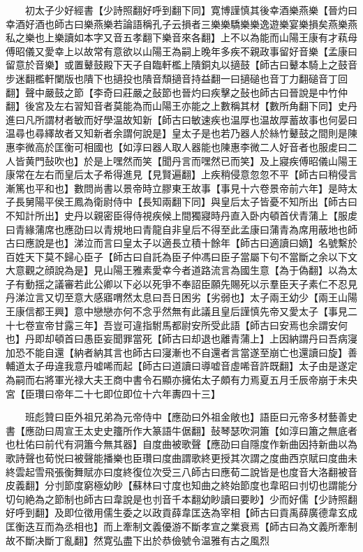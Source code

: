 　　初太子少好經書【少詩照翻好呼到翻下同】寛博謹慎其後幸酒樂燕樂【晉灼曰幸酒好酒也師古曰樂燕樂若論語稱孔子云損者三樂樂驕樂樂逸遊樂宴樂損矣燕樂燕私之樂也上樂讀如本字又音五孝翻下樂音來各翻】上不以為能而山陽王康有才萟母傅昭儀又愛幸上以故常有意欲以山陽王為嗣上晚年多疾不親政事留好音樂【孟康曰留意於音樂】或置鼙鼓殿下天子自臨軒檻上隤銅丸以擿鼓【師古曰鼙本騎上之鼓音步迷翻檻軒闌版也隤下也擿投也隤音頹擿音持益翻一曰擿磓也音丁力翻磓音丁回翻】聲中嚴鼓之節【李奇曰莊嚴之鼔節也晉灼曰疾擊之鼔也師古曰晉說是中竹仲翻】後宮及左右習知音者莫能為而山陽王亦能之上數稱其材【數所角翻下同】史丹進曰凡所謂材者敏而好學温故知新【師古曰敏速疾也温厚也温故厚蓄故事也何晏曰温尋也尋繹故者又知新者余謂何說是】皇太子是也若乃器人於絲竹鼙鼓之間則是陳惠李微高於匡衡可相國也【如淳曰器人取人器能也陳惠李微二人好音者也服䖍曰二人皆黄門鼔吹也】於是上嘿然而笑【聞丹言而嘿然已而笑】及上寢疾傅昭儀山陽王康常在左右而皇后太子希得進見【見賢遍翻】上疾稍侵意忽忽不平【師古曰稍侵言漸篤也平和也】數問尚書以景帝時立膠東王故事【事見十六卷景帝前六年】是時太子長舅陽平侯王鳳為衛尉侍中【長知兩翻下同】與皇后太子皆憂不知所出【師古曰不知計所出】史丹以親密臣得侍視疾候上間獨寢時丹直入卧内頓首伏青蒲上【服䖍曰青緣蒲席也應劭曰以青規地曰青龍自非皇后不得至此孟康曰蒲青為席用蔽地也師古曰應說是也】涕泣而言曰皇太子以適長立積十餘年【師古曰適讀曰嫡】名號繫於百姓天下莫不歸心臣子【師古曰自託為臣子仲馮曰臣子當屬下句不當斷之余以下文大意觀之顔說為是】見山陽王雅素愛幸今者道路流言為國生意【為于偽翻】以為太子有動揺之議審若此公卿以下必以死爭不奉詔臣願先賜死以示羣臣天子素仁不忍見丹涕泣言又切至意大感寤喟然太息曰吾日困劣【劣弱也】太子兩王幼少【兩王山陽王康信都王興】意中戀戀亦何不念乎然無有此議且皇后謹慎先帝又愛太子【事見二十七卷宣帝甘露三年】吾豈可違指駙馬都尉安所受此語【師古曰安焉也余謂安何也】丹即却頓首曰愚臣妄聞罪當死【師古曰却退也離青蒲上】上因納謂丹曰吾病寖加恐不能自還【納者納其言也師古曰寖漸也不自還者言當遂至崩亡也還讀曰旋】善輔道太子毋違我意丹嘘唏而起【師古曰道讀曰導嘘音虛唏音許既翻】太子由是遂定為嗣而右將軍光禄大夫王商中書令石顯亦擁佑太子頗有力焉夏五月壬辰帝崩于未央宮【臣瓚曰帝年二十七即位即位十六年夀四十三】

　　班彪贊曰臣外祖兄弟為元帝侍中【應劭曰外祖金敞也】語臣曰元帝多材藝善史書【應劭曰周宣王太史史籒所作大篆語牛倨翻】鼔琴瑟吹洞簫【如淳曰簫之無底者也杜佑曰前代有洞簫今無其器】自度曲被歌聲【應劭曰自隱度作新曲因持新曲以為歌詩聲也荀悦曰被聲能播樂也臣瓚曰度曲謂歌終更授其次謂之度曲西京賦曰度曲未終雲起雪飛張衡舞賦亦曰度終復位次受三八師古曰應荀二說皆是也度音大洛翻被音皮義翻】分刌節度窮極幼眇【蘇林曰寸度也知曲之終始節度也韋昭曰刌切也謂能分切句絶為之節制也師古曰韋說是也刌音千本翻幼眇讀曰要眇】少而好儒【少詩照翻好呼到翻】及即位徵用儒生委之以政貢薛韋匡迭為宰相【師古曰貢禹薛廣德韋玄成匡衡迭互而為丞相也】而上牽制文義優游不斷孝宣之業衰焉【師古曰為文義所牽制故不斷决斷丁亂翻】然寛弘盡下出於恭儉號令温雅有古之風烈

